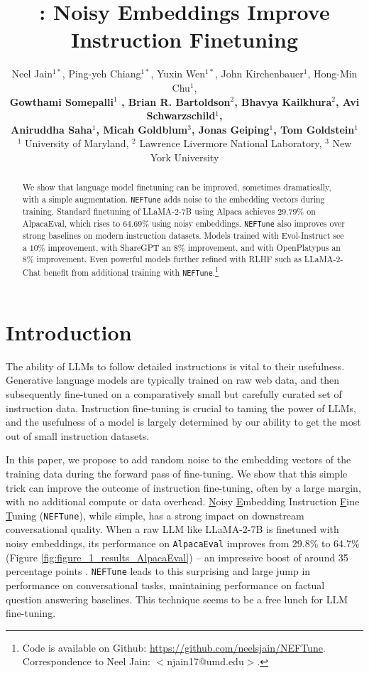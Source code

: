 \documentclass{article} %
\title{\neftune{}: Noisy Embeddings Improve Instruction Finetuning}
\author{Neel Jain$^{1*}$, Ping-yeh Chiang$^{1*}$, Yuxin Wen$^{1*}$, John Kirchenbauer$^{1}$,  Hong-Min Chu$^{1}$,\\ \textbf{Gowthami Somepalli$^{1}$ , Brian R. Bartoldson$^{2}$, Bhavya Kailkhura$^{2}$, Avi Schwarzschild$^{1}$,}\\ \textbf{Aniruddha Saha$^{1}$, Micah Goldblum$^{3}$, Jonas Geiping$^{1}$, Tom Goldstein$^{1}$} \\
{$^{1}$ University of Maryland, 
$^{2}$ Lawrence Livermore National Laboratory,
$^{3}$ New York University
}}
\newcommand{\neftune}{\texttt{NEFTune}}
\newcommand{\llama}{LLaMA}
\begin{document}
\maketitle

\begin{abstract}
We show that language model finetuning can be improved, sometimes dramatically, with a simple augmentation. 
\neftune{} adds noise to the embedding vectors during training.
 Standard finetuning of \llama{}-2-7B using Alpaca achieves $29.79$\% on AlpacaEval, which rises to $64.69$\% using noisy embeddings.
\neftune{} also improves over strong baselines on modern instruction datasets.
Models trained with Evol-Instruct see a $10$\% improvement, with ShareGPT an $8$\% improvement, and with OpenPlatypus an $8$\% improvement. 
Even powerful models further refined with RLHF such as \llama{}-2-Chat benefit from additional training with \neftune{}.\footnote{Code is available on Github: \url{https://github.com/neelsjain/NEFTune}. Correspondence to Neel Jain: $<$njain17@umd.edu$>$.}
\end{abstract}
\vspace{-0.5cm}
\section{Introduction}
The ability of LLMs to follow detailed instructions is vital to their usefulness.  Generative language models are typically trained on raw web data, and then subsequently fine-tuned on a comparatively small but carefully curated set of instruction data. Instruction fine-tuning is crucial to taming the power of LLMs, and the usefulness of a model is largely determined by our ability to get the most out of small instruction datasets.

 In this paper, we propose to add random noise to the embedding vectors of the training data during the forward pass of fine-tuning. We show that this simple trick can improve the outcome of instruction fine-tuning, often by a large margin, with no additional compute or data overhead. \underline{N}oisy \underline{E}mbedding Instruction \underline{F}ine \underline{T}uning (\neftune{}), while simple, has a strong impact on downstream conversational quality.  When a raw LLM like \llama{}-2-7B is finetuned with noisy embeddings, its performance on \texttt{AlpacaEval} improves from 29.8\% to 64.7\% (Figure \ref{fig:figure_1_results_AlpacaEval}) -- an impressive boost of around 35 percentage points 
\citep{touvron2023llama2, dubois2023alpacafarm}. \neftune{} leads to this surprising and large jump in performance on conversational tasks, maintaining performance on factual question answering baselines.
This technique seems to be a free lunch for LLM fine-tuning.
\end{document}
